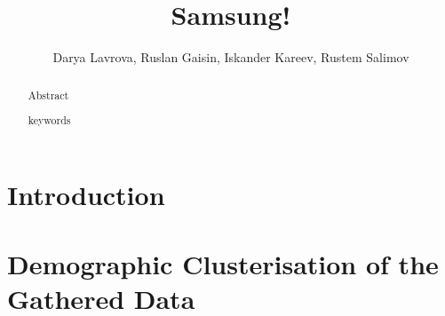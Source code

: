 \documentclass[runningheads,a4paper]{llncs}
\newcommand{\keywords}[1]{\par\addvspace\baselineskip
\noindent\keywordname\enspace\ignorespaces#1}
\begin{document}
\mainmatter  %

\title{Samsung!}




\author{Darya Lavrova, Ruslan Gaisin, Iskander Kareev, Rustem Salimov}
%


%
%

\maketitle


\begin{abstract}
Abstract
\keywords{keywords}
\end{abstract}


\section{Introduction}



\section{Demographic Clusterisation of the Gathered Data}
\end{document}
